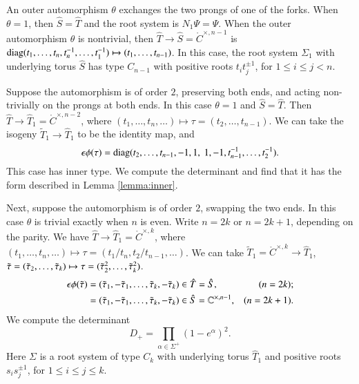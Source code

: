 An outer automorphism $\theta$ exchanges the two prongs of one of the forks.
When $\theta=1$, then $\hat S = \hat T$ and the root system is $N_1\Psi = \Psi$.
When the outer automorphism $\theta$ is nontrivial, then
$\hat T\to \hat S =\ring{C}^{\times,n-1}$ is ${\operatorname{diag}}(t_1,\ldots,t_n,t_n^{-1},\ldots,t_1^{-1})\mapsto (t_1,\ldots,t_{n-1})$.
In this case, the root system $\Sigma_1$ with underlying torus $\hat S$ has type $C_{n-1}$ with positive roots $t_i t_j^{\pm 1}$, for $1\le i\le j<n$.

Suppose the automorphism is of order $2$, preserving both ends, and acting non-trivially on the prongs at both ends.
In this case $\theta=1$ and $\hat S = \hat T$.
Then $\hat T\to \hat T_1 = \ring{C}^{\times,n-2}$, where $(t_1,\ldots,t_n,\ldots)\mapsto \tau = (t_2,\ldots,t_{n-1})$.
We can take the isogeny $\tilde T_1\to \hat T_1$ to be the identity map, and
\[
\epsilon\phi(\tau) = \op{diag}(t_2,\ldots,t_{n-1},-1,1,\ 1,-1,t_{n-1}^{-1},\ldots,t_2^{-1}).
\]
This case has inner type.
We compute the determinant and find that it has the form described in Lemma \ref{lemma:inner}.

Next, suppose the automorphism is of order $2$, swapping the two ends.
In this case $\theta$ is trivial exactly when $n$ is even.    
Write $n=2k$ or $n=2k+1$, depending on the parity.
We have $\hat T\to \hat T_1 = \ring{C}^{\times,k}$, where $(t_1,\ldots,t_n,\ldots)\mapsto \tau=(t_1/t_n,t_2/t_{n-1},\ldots)$.
We can take $\tilde T_1 =\ring{C}^{\times,k}\to \hat T_1$, $\tilde\tau = (\tilde\tau_2,\ldots,\tilde\tau_k)\mapsto \tau=(\tilde\tau_2^2,\ldots,\tilde\tau_k^2)$.
\begin{align*}
\epsilon \phi(\tilde\tau)&= (\tilde\tau_1,-\tilde\tau_1,\ldots,\tilde\tau_k,-\tilde\tau_k) \in \hat T = \hat S, &(n=2k);\\
&= (\tilde\tau_1,-\tilde\tau_1,\ldots,\tilde\tau_k,-\tilde\tau_k)\in \hat S = \mathbb{C}^{\times,n-1}, &(n=2k+1).
\end{align*}
We compute the determinant
\begin{equation}
D_+ = \prod_{\alpha\in\Sigma^+} (1-e^\alpha)^2.
\end{equation}
Here $\Sigma$ is a root system of type $C_k$ with underlying torus $\hat T_1$ and positive roots $s_i s_j^{\pm 1}$, for $1\le i\le j\le k$.

